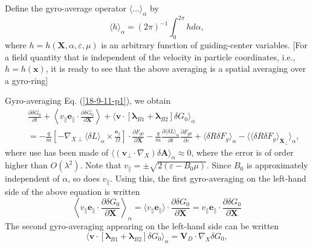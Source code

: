 \documentclass{article}
\newcommand{\tmmathbf}[1]{\ensuremath{\boldsymbol{#1}}}
\begin{document}
Define the gyro-average operator $\langle \ldots \rangle_{\alpha}$ by
\begin{equation}
  \langle h \rangle_{\alpha} = (2 \pi)^{- 1} \int_0^{2 \pi} h d \alpha,
\end{equation}
where $h = h (\mathbf{X}, \alpha, \varepsilon, \mu)$ is an arbitrary function
of guiding-center variables. [For a field quantity that is independent of the
velocity in particle coordinates, i.e., $h = h (\mathbf{x})$, it is ready to
see that the above averaging is a spatial averaging over a gyro-ring]

Gyro-averaging Eq. (\ref{18-9-11-p1}), we obtain
\begin{eqnarray}
  &  & \frac{\partial \delta G_0}{\partial t} + \left\langle v_{\parallel}
  \mathbf{e}_{\parallel} \cdot \frac{\partial \delta G_0}{\partial \mathbf{X}}
  \right\rangle + \langle \mathbf{v} \cdot [\tmmathbf{\lambda}_{B 1}
  +\tmmathbf{\lambda}_{B 2}] \delta G_0 \rangle_{\alpha} \nonumber\\
  &  & = - \frac{q}{m} \left[ - \nabla_{X \perp} \langle \delta L
  \rangle_{\alpha} \times \frac{\tmmathbf{e}_{\parallel}}{\Omega} \right]
  \cdot \frac{\partial F_{g 0}}{\partial \mathbf{X}} - \frac{q}{m} 
  \frac{\partial \langle \delta L \rangle_{\alpha}}{\partial t} 
  \frac{\partial F_{g 0}}{\partial \varepsilon} + \langle \delta R \delta F_g
  \rangle_{\alpha} - \langle \langle \delta R \delta F_g
  \rangle_{\mathbf{X}_{\perp}} \rangle_{\alpha},  \label{18-9-11-p4}
\end{eqnarray}
where use has been made of $\langle (\mathbf{v}_{\perp} \cdot \nabla_X) \delta
\mathbf{A} \rangle_{\alpha} \approx 0$, where the error is of order higher
than $O (\lambda^2)$. Note that $v_{\parallel} = \pm \sqrt{2 (\varepsilon -
B_0 \mu)}$. Since $B_0$ is approximately independent of $\alpha$, so does
$v_{\parallel}$. Using this, the first gyro-averaging on the left-hand side of
the above equation is written
\begin{equation}
  \left\langle v_{\parallel} \mathbf{e}_{\parallel} \cdot \frac{\partial
  \delta G_0}{\partial \mathbf{X}} \right\rangle_{\alpha} = \langle
  v_{\parallel} \mathbf{e}_{\parallel} \rangle \cdot \frac{\partial \delta
  G_0}{\partial \mathbf{X}} = v_{\parallel} \mathbf{e}_{\parallel} \cdot
  \frac{\partial \delta G_0}{\partial \mathbf{X}}
\end{equation}
The second gyro-averaging appearing on the left-hand side can be written
\begin{equation}
  \label{18-9-11-p3} \langle \mathbf{v} \cdot [\tmmathbf{\lambda}_{B 1}
  +\tmmathbf{\lambda}_{B 2}] \delta G_0 \rangle_{\alpha} =\mathbf{V}_D \cdot
  \nabla_X \delta G_0,
\end{equation}
\end{document}
